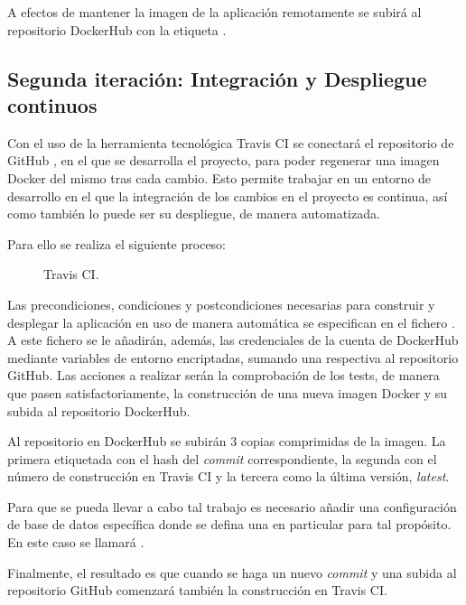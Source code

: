 A efectos de mantener la imagen de la aplicación remotamente se subirá al repositorio DockerHub con la etiqueta .

\subsection{Segunda iteración: Integración y Despliegue continuos}

Con el uso de la herramienta tecnológica Travis CI se conectará el repositorio de GitHub , en el que se desarrolla el proyecto, para poder regenerar una imagen Docker del mismo tras cada cambio. Esto permite trabajar en un entorno de desarrollo en el que la integración de los cambios en el proyecto es continua, así como también lo puede ser su despliegue, de manera automatizada.

Para ello se realiza el siguiente proceso:
\begin{figure}[H]
\caption{Travis CI.\label{fig:figure_placement_example}}
\end{figure}

Las precondiciones, condiciones y postcondiciones necesarias para construir y desplegar la aplicación en uso de manera automática se especifican en el fichero . A este fichero se le añadirán, además, las credenciales de la cuenta de DockerHub mediante variables de entorno encriptadas, sumando una respectiva al repositorio GitHub. Las acciones a realizar serán la comprobación de los tests, de manera que pasen satisfactoriamente, la construcción de una nueva imagen Docker y su subida al repositorio DockerHub.

Al repositorio en DockerHub se subirán 3 copias comprimidas de la imagen. La primera etiquetada con el hash del \textit{commit} correspondiente, la segunda con el número de construcción en Travis CI y la tercera como la última versión, \textit{latest}.

Para que se pueda llevar a cabo tal trabajo es necesario añadir una configuración de base de datos específica donde se defina una en particular para tal propósito. En este caso se llamará .

Finalmente, el resultado es que cuando se haga un nuevo \textit{commit} y una subida al repositorio GitHub comenzará también la construcción en Travis CI.